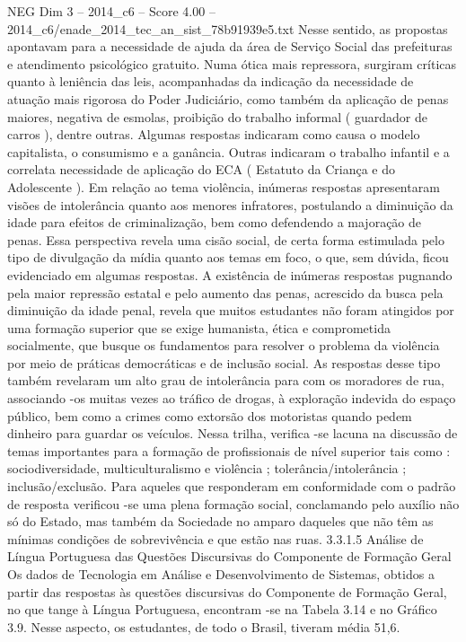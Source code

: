 \begin{textsample}{NEG Dim 3 – 2014\_c6 – Score 4.00 – 2014\_c6/enade\_2014\_tec\_an\_sist\_78b91939e5.txt}
Nesse sentido, as propostas apontavam para a necessidade de ajuda da área de Serviço Social das prefeituras e atendimento psicológico gratuito.
Numa ótica mais repressora, surgiram críticas quanto à leniência das leis, acompanhadas da indicação da necessidade de atuação mais rigorosa do Poder Judiciário, como também da aplicação de penas maiores, negativa de esmolas, proibição do trabalho informal ( guardador de carros ), dentre outras.
Algumas respostas indicaram como causa o modelo capitalista, o consumismo e a ganância.
Outras indicaram o trabalho infantil e a correlata necessidade de aplicação do ECA ( Estatuto da Criança e do Adolescente ).
Em relação ao tema violência, inúmeras respostas apresentaram visões de intolerância quanto aos menores infratores, postulando a diminuição da idade para efeitos de criminalização, bem como defendendo a majoração de penas.
Essa perspectiva revela uma cisão social, de certa forma estimulada pelo tipo de divulgação da mídia quanto aos temas em foco, o que, sem dúvida, ficou evidenciado em algumas respostas.
A existência de inúmeras respostas pugnando pela maior repressão estatal e pelo aumento das penas, acrescido da busca pela diminuição da idade penal, revela que muitos estudantes não foram atingidos por uma formação superior que se exige humanista, ética e comprometida socialmente, que busque os fundamentos para resolver o problema da violência por meio de práticas democráticas e de inclusão social.
As respostas desse tipo também revelaram um alto grau de intolerância para com os moradores de rua, associando -os muitas vezes ao tráfico de drogas, à exploração indevida do espaço público, bem como a crimes como extorsão dos motoristas quando pedem dinheiro para guardar os veículos.
Nessa trilha, verifica -se lacuna na discussão de temas importantes para a formação de profissionais de nível superior tais como : sociodiversidade, multiculturalismo e violência ; tolerância/intolerância ; inclusão/exclusão.
Para aqueles que responderam em conformidade com o padrão de resposta verificou -se uma plena formação social, conclamando pelo auxílio não só do Estado, mas também da Sociedade no amparo daqueles que não têm as mínimas condições de sobrevivência e que estão nas ruas. 3.3.1.5 Análise de Língua Portuguesa das Questões Discursivas do Componente de Formação Geral Os dados de Tecnologia em Análise e Desenvolvimento de Sistemas, obtidos a partir das respostas às questões discursivas do Componente de Formação Geral, no que tange à Língua Portuguesa, encontram -se na Tabela 3.14 e no Gráfico 3.9.
Nesse aspecto, os estudantes, de todo o Brasil, tiveram média 51,6.

\end{textsample}
